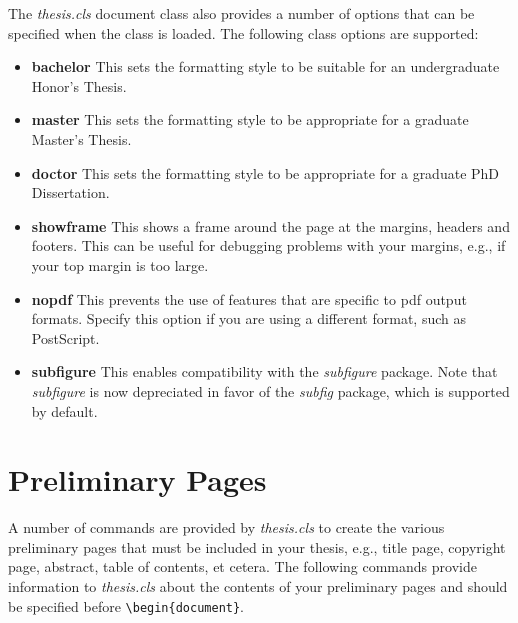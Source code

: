 \documentclass[master]{thesis}
\begin{document}
The \textit{thesis.cls} document class also provides a number of options that can be specified when the class is loaded.  The following class options are supported:

\begin{itemize}
    \item \textbf{bachelor}  This sets the formatting style to be suitable for an undergraduate Honor's Thesis.

    \item \textbf{master}  This sets the formatting style to be appropriate for a graduate Master's Thesis.

    \item \textbf{doctor}  This sets the formatting style to be appropriate for a graduate PhD Dissertation.

    \item \textbf{showframe}  This shows a frame around the page at the margins, headers and footers.  This can be useful for debugging problems with your margins, e.g., if your top margin is too large.

    \item \textbf{nopdf}  This prevents the use of features that are specific to pdf output formats.  Specify this option if you are using a different format, such as PostScript.

    \item \textbf{subfigure}  This enables compatibility with the \textit{subfigure} package.  Note that \textit{subfigure} is now depreciated in favor of the \textit{subfig} package, which is supported by default.
\end{itemize}

\section{Preliminary Pages}

A number of commands are provided by \textit{thesis.cls} to create the various preliminary pages that must be included in your thesis, e.g., title page, copyright page, abstract, table of contents, et cetera.  The following commands provide information to \textit{thesis.cls} about the contents of your preliminary pages and should be specified before \verb|\begin{document}|.
\end{document}
